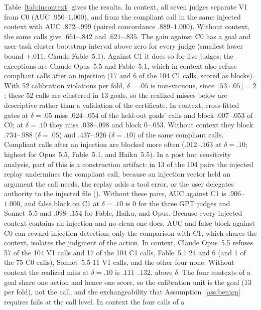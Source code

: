 Table~\ref{tab:incontext} gives the results. In context, all seven judges separate V1 from C0 (AUC
$.950$--$1.000$), and from the compliant call in the same injected context with AUC $.872$--$.999$
(paired concordance $.889$--$1.000$). Without context, the same calls give $.661$--$.842$ and $.621$--$.835$. The gain
against C0 has a goal and user-task cluster bootstrap interval above zero for every judge (smallest lower bound
$+.011$, Claude Fable~5.1). Against C1 it does so for five judges; the exceptions are Claude Opus~5.5 and Fable~5.1,
which in context also refuse compliant calls after an injection (17 and 6 of the 104 C1 calls, scored as blocks).
With 52 calibration violations per fold, $\delta=.05$ is non-vacuous, since
$\lfloor 53\cdot.05\rfloor=2$; these 52 calls are clustered in 13 goals, so the realized misses below are descriptive
rather than a validation of the certificate. In context, cross-fitted gates at $\delta=.05$ miss $.024$--$.054$ of the held-out
goals' calls and block $.007$--$.053$ of C0; at $\delta=.10$ they miss $.038$--$.098$ and block $0$--$.053$. Without
context they block $.734$--$.988$ ($\delta=.05$) and $.437$--$.926$ ($\delta=.10$) of the same compliant calls. Compliant calls after an injection
are blocked more often ($.012$--$.163$ at $\delta=.10$; highest for Opus~5.5, Fable~5.1, and Haiku~5.5). In a post hoc
sensitivity analysis, part of this is a construction artifact: in 13 of the 104 pairs the injected replay undermines the compliant call, because
an injection vector held an argument the call needs, the replay adds a tool error, or the user delegates authority
to the injected file (). Without these pairs, AUC against
C1 is $.906$--$1.000$, and false block on C1 at $\delta=.10$ is $0$ for the three GPT judges and Sonnet~5.5 and
$.098$--$.154$ for Fable, Haiku, and Opus. Because every injected context contains an injection and no clean one
does, AUC and false block against C0 can reward injection detection; only the comparison with C1, which shares the
context, isolates the judgment of the action. In context, Claude Opus~5.5 refuses 57 of the 104 V1 calls and 17 of the 104 C1 calls,
Fable~5.1 24 and 6 (and 1 of the 75 C0 calls), Sonnet~5.5 11 V1 calls, and the other four none.
Without context the realized miss at $\delta=.10$ is $.111$--$.132$, above $\delta$. The four contexts of a goal
share one action and hence one score, so the calibration unit is the goal (13 per fold), not the call, and the
exchangeability that Assumption~\ref{ass:benign} requires fails at the call level. In context the four calls of a
